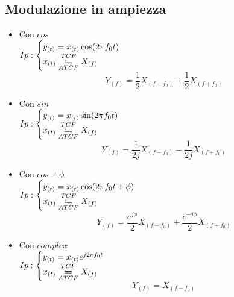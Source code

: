     \subsection{Modulazione in ampiezza}    
        \begin{itemize}
            \item {Con $cos$\\
                $Ip:\begin{cases}
                    y_{(t)}= x_{(t)}\cos(2\pi f_0t)\\        
                    x_{(t)}\overunderset{TCF}{ATCF}{\leftrightharpoons} X_{(f)}
                \end{cases}$\\
                \[ Y_{(f)} = \frac{1}{2} X_{(f-f_0)} + \frac{1}{2} X_{(f+f_0)}\]
            }
            \item {Con $sin$\\
                $Ip:\begin{cases}
                    y_{(t)}= x_{(t)}\sin(2\pi f_0t)\\        
                    x_{(t)}\overunderset{TCF}{ATCF}{\leftrightharpoons} X_{(f)}
                \end{cases}$\\
                \[Y_{(f)} = \frac{1}{2j} X_{(f-f_0)} - \frac{1}{2j} X_{(f+f_0)} \]
            }
            \item {Con $cos+\phi$\\
                $Ip: \begin{cases}
                    y_{(t)}= x_{(t)}\cos(2\pi f_0t + \phi)\\        
                    x_{(t)}\overunderset{TCF}{ATCF}{\leftrightharpoons} X_{(f)}
                    \end{cases}$\\
                \[Y_{(f)} = \frac{e^{j\phi}}{2} X_{(f-f_0)} + \frac{e^{-j\phi}}{2} X_{(f+f_0)} \]
            }
            \item {Con $complex$\\
                $Ip: \begin{cases}
                    y_{(t)}= x_{(t)}e^{j2\pi f_0t}\\        
                    x_{(t)}\overunderset{TCF}{ATCF}{\leftrightharpoons} X_{(f)}
                    \end{cases}$\\
                \[Y_{(f)} = X_{(f-f_0)} \]
            }
        \end{itemize}
